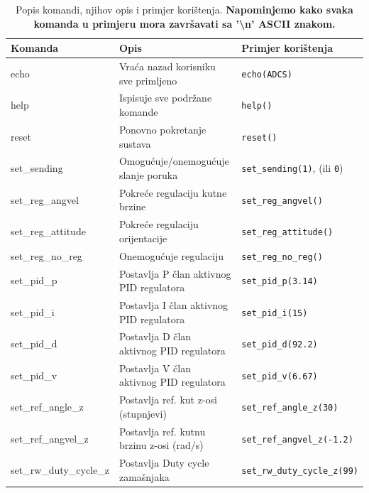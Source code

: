 \documentclass[times, utf8, diplomski, numeric]{templates/template}
\begin{document}
{{{{                \begin{table}[htb]
                \caption{Popis komandi, njihov opis i primjer korištenja. \textbf{Napominjemo kako svaka komanda u primjeru mora završavati sa '\textbackslash n' ASCII znakom.}}
                \label{tbl:lista_komandi}
                \centering
                \begin{tabular}{lll} 
                \toprule
                Komanda & Opis & Primjer korištenja \\ 
                \midrule
                echo                     & Vraća nazad korisniku sve primljeno          & \texttt{echo(ADCS)}                           \\
                help                     & Ispisuje sve podržane komande                & \texttt{help()}                               \\
                reset                    & Ponovno pokretanje sustava                   & \texttt{reset()}                              \\
                set\_sending             & Omogućuje/onemogućuje slanje poruka          & \texttt{set\_sending(1)}, (ili \texttt{0})    \\
                set\_reg\_angvel         & Pokreće regulaciju kutne brzine              & \texttt{set\_reg\_angvel()}                   \\
                set\_reg\_attitude       & Pokreće regulaciju orijentacije              & \texttt{set\_reg\_attitude()}                 \\
                set\_reg\_no\_reg        & Onemogućuje regulaciju                       & \texttt{set\_reg\_no\_reg()}                  \\
                set\_pid\_p              & Postavlja P član aktivnog PID regulatora     & \texttt{set\_pid\_p(3.14)}                    \\
                set\_pid\_i              & Postavlja I član aktivnog PID regulatora     & \texttt{set\_pid\_i(15)}                      \\
                set\_pid\_d              & Postavlja D član aktivnog PID regulatora     & \texttt{set\_pid\_d(92.2)}                    \\
                set\_pid\_v              & Postavlja V član aktivnog PID regulatora     & \texttt{set\_pid\_v(6.67)}                   \\
                set\_ref\_angle\_z       & Postavlja ref. kut z-osi (stupnjevi)         & \texttt{set\_ref\_angle\_z(30)}               \\
                set\_ref\_angvel\_z      & Postavlja ref. kutnu brzinu z-osi (rad/s)    & \texttt{set\_ref\_angvel\_z(-1.2)}            \\
                set\_rw\_duty\_cycle\_z  & Postavlja Duty cycle zamašnjaka              & \texttt{set\_rw\_duty\_cycle\_z(99)}          \\
                \bottomrule
                \end{tabular}
                \end{table}

}}}}
\end{document}
